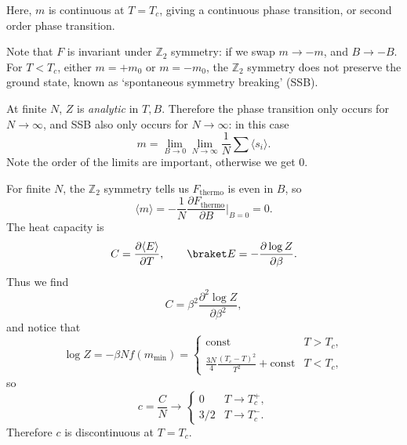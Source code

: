 \documentclass[12pt]{article}
\begin{document}
\begin{center}
\end{center}

Here, $m$ is continuous at $T = T_c$, giving a continuous phase transition, or second order phase transition.

Note that $F$ is invariant under $\mathbb{Z}_2$ symmetry: if we swap $m \to -m$, and $B \to -B$. For $T < T_c$, either $m = +m_0$ or $m = -m_0$, the $\mathbb{Z}_2$ symmetry does not preserve the ground state, known as `spontaneous symmetry breaking' (SSB).

At finite $N$, $Z$ is \emph{analytic} in $T, B$. Therefore the phase transition only occurs for $N \to \infty$, and SSB also only occurs for $N \to \infty$: in this case
\[
m = \lim_{B \to 0} \lim_{N \to \infty} \frac{1}{N} \sum \langle s_i \rangle.
\]
Note the order of the limits are important, otherwise we get 0.

For finite $N$, the $\mathbb{Z}_2$ symmetry tells us $F_{\mathrm{thermo}}$ is even in $B$, so
\[
	\langle m \rangle = - \frac{1}{N} \frac{\partial F_{\mathrm{thermo}}}{\partial B} \biggr|_{B= 0} = 0.
\]
The heat capacity is
\[
C = \frac{\partial \langle E \rangle}{\partial T}, \qquad \braket E = - \frac{\partial \log Z}{\partial \beta}.
\]
Thus we find
\[
C = \beta^2 \frac{\partial^2 \log Z}{\partial \beta^2},
\]
and notice that
\[
\log Z = - \beta N f(m_{\mathrm{min}}) = 
\begin{cases}
	\text{const} & T > T_c, \\
	\frac{3N}{4} \frac{(T_c - T)^2}{T^2} + \text{const} & T< T_c,
\end{cases}
\]
so
\[
c = \frac{C}{N} \to
\begin{cases}
	0 & T \to T_c^+, \\
	3/2 & T \to T_c^-.
\end{cases}
\]
Therefore $c$ is discontinuous at $T = T_c$.
\end{document}
